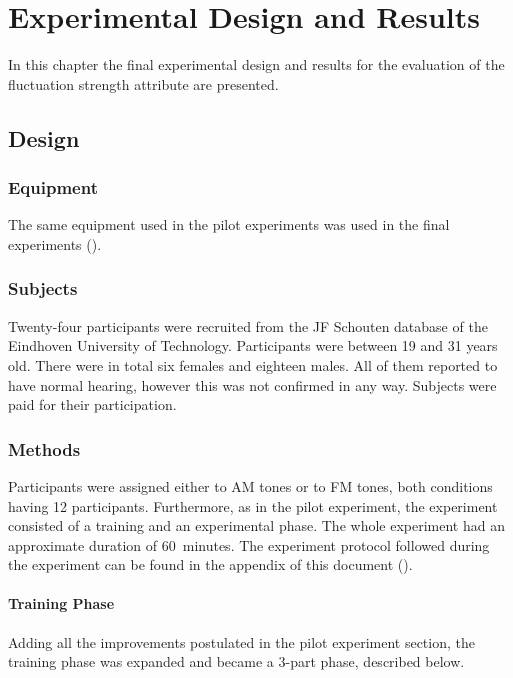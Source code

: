 \documentclass[../main.tex]{subfiles}
\begin{document}
\chapter{Experimental Design and Results}
\label{cha:experiment}

In this chapter the final experimental design and results for the evaluation
of the fluctuation strength attribute are presented.

\section{Design}

\subsection{Equipment}

The same equipment used in the pilot experiments was used in the final
experiments ().

\subsection{Subjects}

Twenty-four participants were recruited from the JF Schouten database of the
Eindhoven University of Technology. Participants were between 19 and 31 years
old. There were in total six females and eighteen males. All of them reported
to have normal hearing, however this was not confirmed in any way. Subjects were
paid for  their participation.

\subsection{Methods}

Participants were assigned either to \gls{AM} tones or to \gls{FM} tones, both
conditions having 12 participants. Furthermore, as in the pilot experiment, the
experiment consisted of a training and an experimental phase. The whole
experiment had an approximate duration of 60~minutes. The experiment protocol
followed during the experiment can be found in the appendix of this document
().

\subsubsection{Training Phase}

Adding all the improvements postulated in the pilot experiment section, the
training phase was expanded and became a 3-part phase, described below.
\end{document}
